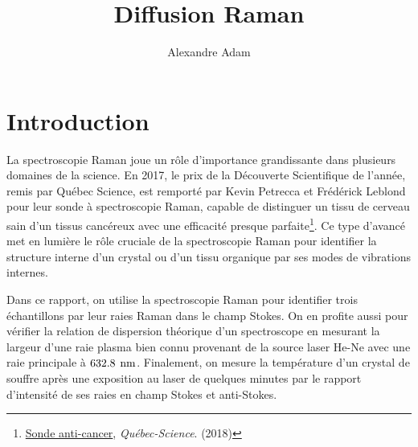 \documentclass[10pt,letterpaper,twocolumn]{article}
\title{\vspace{-10mm}\Large
Diffusion Raman %
\vspace{-4mm}}
\author{\large
Alexandre Adam
}
\date{\vspace{-8mm}}
\newcommand{\s}{\hspace{0.1cm}}
\newcommand{\unit}[1]{\hspace{0.15cm}\text{#1}}
\begin{document}
\twocolumn[
\maketitle
\begin{onecolabstract} %
	Nous déterminons la nature chimique de trois échantillons à partir de leur spectre Raman dans le champ Stokes. On trouve une raie à $788.0\pm 2\unit{cm}^{-1}$ pour le premier échantillon correspondant au polytope 6H-\ce{SiC}. Les pics $307\pm 5\unit{cm}^{-1}$ et $351 \pm 5\unit{cm}^{-1}$ apparaissent dans le spectre de l'échantillon 2, indiquant la présence de \ce{InP}. Le pic $230 \pm 2\unit{cm}^{-1}$ est observé pour l'échantillon 3, indiquant un crystal de \ce{TiS2}. Nous vérifions aussi la loi de dispersion du spectroscope utilisé en laboratoire, et trouvons que la résolution expérimentale est plus basse que la résolution idéale. Finalement, on mesure la température du souffre après quelques minutes d'expositions au laser comme étant $T = 3.3 \pm 2\s\s 10^2K$, une augmentation de quelques dizaine de degrés par rapport à la température ambiante.
\vspace{4mm} %
\end{onecolabstract}
]

\section{Introduction}\label{intro} %
La spectroscopie Raman joue un rôle d'importance grandissante dans plusieurs domaines de la science. En 2017, le prix de la Découverte Scientifique de l'année, remis par Québec Science, est remporté par Kevin Petrecca et Frédérick Leblond pour leur sonde à spectroscopie Raman, capable de distinguer un tissu de cerveau sain d'un tissus cancéreux avec une efficacité presque parfaite\footnote{\href{https://www.quebecscience.qc.ca/sciences/les-10-decouvertes-de-2017/2-sonde-anti-cancer/}{Sonde anti-cancer}, \textit{Québec-Science}. (2018)}. Ce type d'avancé met en lumière le rôle cruciale de la spectroscopie Raman pour identifier la structure interne d'un crystal ou d'un tissu organique par ses modes de vibrations internes. \par
Dans ce rapport, on utilise la spectroscopie Raman pour identifier trois échantillons par leur raies Raman dans le champ Stokes. On en profite aussi pour vérifier la relation de dispersion théorique d'un spectroscope en mesurant la largeur d'une raie plasma bien connu provenant de la source laser He-Ne avec une raie principale à $632.8\unit{nm}$. Finalement, on mesure la température d'un crystal de souffre après une exposition au laser de quelques minutes par le rapport d'intensité de ses raies en champ Stokes et anti-Stokes.
\end{document}
